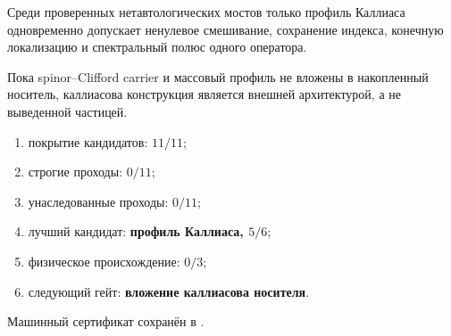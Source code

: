 \begin{theorem}
Среди проверенных нетавтологических мостов только профиль Каллиаса
одновременно допускает ненулевое смешивание, сохранение индекса, конечную
локализацию и спектральный полюс одного оператора.
\end{theorem}
\begin{nogocriterion}
Пока spinor--Clifford carrier и массовый профиль не вложены в накопленный
носитель, каллиасова конструкция является внешней архитектурой, а не
выведенной частицей.
\end{nogocriterion}
\begin{protocol}\begin{enumerate}
\item покрытие кандидатов: \textbf{$11/11$};
\item строгие проходы: \textbf{$0/11$};
\item унаследованные проходы: \textbf{$0/11$};
\item лучший кандидат: \textbf{профиль Каллиаса, $5/6$};
\item физическое происхождение: \textbf{$0/3$};
\item следующий гейт: \textbf{вложение каллиасова носителя}.
\end{enumerate}\end{protocol}
Машинный сертификат сохранён в
.